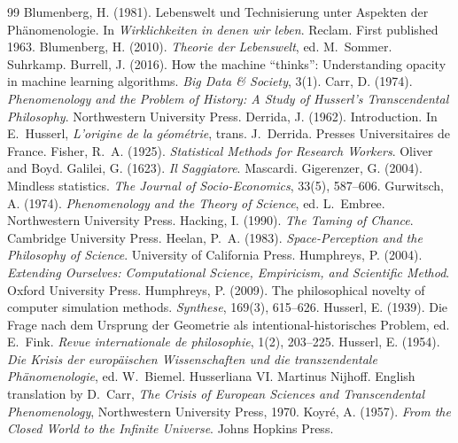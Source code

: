 \documentclass{situationist-preprint}
\begin{document}
\begin{thebibliography}{99}\small
{} Blumenberg, H. (1981). Lebenswelt und Technisierung unter Aspekten der Phänomenologie. In \emph{Wirklichkeiten in denen wir leben}. Reclam. First published 1963.
 Blumenberg, H. (2010). \emph{Theorie der Lebenswelt}, ed. M.~Sommer. Suhrkamp.
 Burrell, J. (2016). How the machine \enquote{thinks}: Understanding opacity in machine learning algorithms. \emph{Big Data \& Society}, 3(1).
 Carr, D. (1974). \emph{Phenomenology and the Problem of History: A Study of Husserl's Transcendental Philosophy}. Northwestern University Press.
 Derrida, J. (1962). Introduction. In E.~Husserl, \emph{L'origine de la géométrie}, trans. J.~Derrida. Presses Universitaires de France.
 Fisher, R.~A. (1925). \emph{Statistical Methods for Research Workers}. Oliver and Boyd.
 Galilei, G. (1623). \emph{Il Saggiatore}. Mascardi.
 Gigerenzer, G. (2004). Mindless statistics. \emph{The Journal of Socio-Economics}, 33(5), 587--606.
 Gurwitsch, A. (1974). \emph{Phenomenology and the Theory of Science}, ed. L.~Embree. Northwestern University Press.
 Hacking, I. (1990). \emph{The Taming of Chance}. Cambridge University Press.
 Heelan, P.~A. (1983). \emph{Space-Perception and the Philosophy of Science}. University of California Press.
 Humphreys, P. (2004). \emph{Extending Ourselves: Computational Science, Empiricism, and Scientific Method}. Oxford University Press.
 Humphreys, P. (2009). The philosophical novelty of computer simulation methods. \emph{Synthese}, 169(3), 615--626.
 Husserl, E. (1939). Die Frage nach dem Ursprung der Geometrie als intentional-historisches Problem, ed. E.~Fink. \emph{Revue internationale de philosophie}, 1(2), 203--225.
 Husserl, E. (1954). \emph{Die Krisis der europäischen Wissenschaften und die transzendentale Phänomenologie}, ed. W.~Biemel. Husserliana VI. Martinus Nijhoff. English translation by D.~Carr, \emph{The Crisis of European Sciences and Transcendental Phenomenology}, Northwestern University Press, 1970.
 Koyré, A. (1957). \emph{From the Closed World to the Infinite Universe}. Johns Hopkins Press.

\end{thebibliography}
\end{document}
